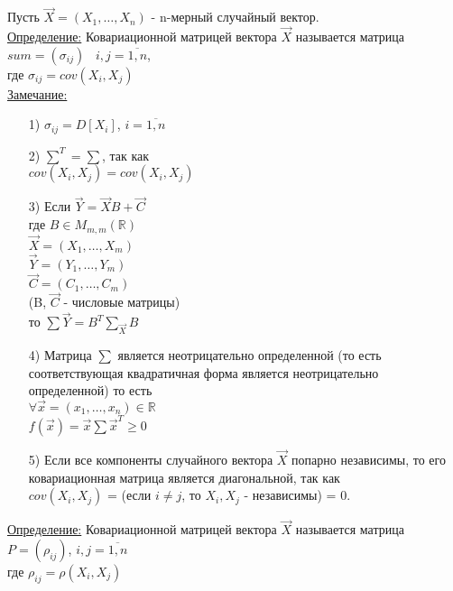 Пусть $\vec{X} = (X_1, \ldots, X_n)$ - n-мерный случайный вектор.
\\
\underline{Определение:} Ковариационной матрицей вектора $\vec{X}$ называется матрица \\
$sum = (\sigma_{ij})$ \ $i, j = \overline{1,n}$,\\
где $\sigma_{ij} = cov(X_i, X_j)$
\\
\underline{Замечание:}
\begin{enumerate}
	\item[1)] $\sigma_{ij} = D[X_i]$, $i = \overline{1,n}$
	
	\item[2)] $\sum^T = \sum$, так как \\
	$cov(X_i, X_j) = cov(X_i, X_j)$
	
	\item[3)] Если  $\vec{Y} = \vec{X}B + \vec{C}$\\
	где $B \in M_{m,m} (\mathbb{R})$\\
	$\vec{X} = (X_1, \ldots, X_m)$\\
	$\vec{Y} = (Y_1, \ldots, Y_m)$\\
	$\vec{C} = (C_1, \ldots, C_m)$\\
	(B, $\vec{C}$ - числовые матрицы)\\
	то $\sum \vec{Y} = B^T \sum_{\vec{X}} B$\\
	
	\item[4)] Матрица $\sum$ является неотрицательно определенной (то есть соответствующая квадратичная форма является неотрицательно определенной) то есть\\
	$\forall \vec{x} = (x_1, \ldots, x_n) \in \mathbb{R}$\\
	$f(\vec{x}) = \vec{x} \sum \vec{x}^T \geqslant 0$\\
	
	\item[5)] Если все компоненты случайного вектора $\vec{X}$ попарно независимы, то его ковариационная матрица является диагональной, так как\\
	$cov(X_i, X_j)$ = (если $i \neq j$, то $X_i, X_j$ - независимы) = 0.
\end{enumerate}


\underline{Определение:} Ковариационной матрицей вектора $\vec{X}$ называется матрица\\
$P = (\rho_{ij})$, $i, j = \overline{1,n}$\\
где $\rho_{ij} = \rho(X_i, X_j)$\\





























